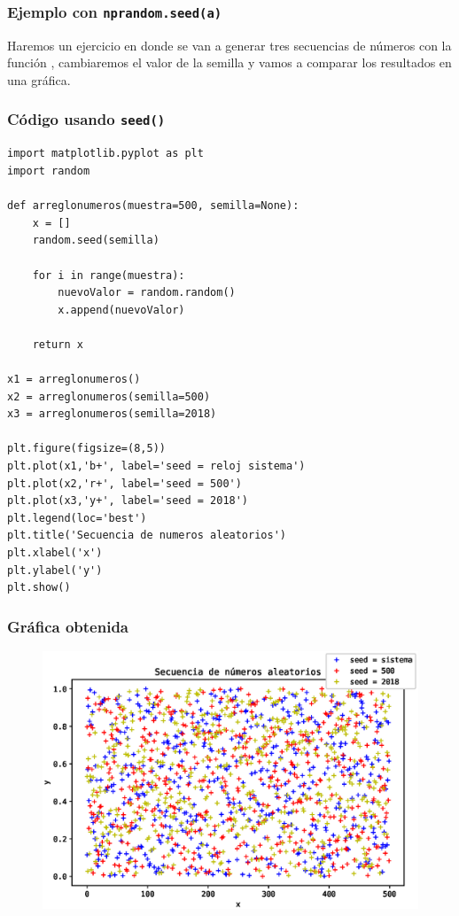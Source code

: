 \documentclass[12pt]{beamer}
\begin{document}
\begin{frame}
\frametitle{Ejemplo con \texttt{nprandom.seed(a)}}
Haremos un ejercicio en donde se van a generar tres secuencias de números con la función , cambiaremos el valor de la semilla y vamos a comparar los resultados en una gráfica.
\end{frame}
\begin{frame}
\frametitle{Código usando \texttt{seed()}}
\begin{lstlisting}[caption=Código con semilla]
import matplotlib.pyplot as plt
import random

def arreglonumeros(muestra=500, semilla=None):
    x = []
    random.seed(semilla)
    
    for i in range(muestra):
        nuevoValor = random.random()
        x.append(nuevoValor)
    
    return x

x1 = arreglonumeros()
x2 = arreglonumeros(semilla=500)
x3 = arreglonumeros(semilla=2018)

plt.figure(figsize=(8,5)) 
plt.plot(x1,'b+', label='seed = reloj sistema')
plt.plot(x2,'r+', label='seed = 500')
plt.plot(x3,'y+', label='seed = 2018')
plt.legend(loc='best')
plt.title('Secuencia de numeros aleatorios')
plt.xlabel('x')
plt.ylabel('y')
plt.show()
\end{lstlisting}
\end{frame}
\begin{frame}[fragile]
\frametitle{Gráfica obtenida}
\begin{figure}
  \centering
  \includegraphics[scale=0.50]{Imagenes/Secuencia_aleatoria_04.eps}
\end{figure}
\end{frame}
\end{document}
